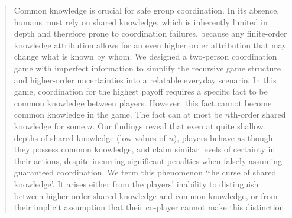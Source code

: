 \begin{abstract}
Common knowledge is crucial for safe group coordination. In its absence, %
humans must %
rely on shared knowledge, %
which is inherently limited in depth and therefore prone to coordination failures,
because any finite-order knowledge attribution allows for an even higher order attribution that may change what is known by whom. 
 We %
designed a two-person coordination game with imperfect information to simplify the %
recursive game structure  and higher-order uncertainties into a relatable everyday scenario. 
In this game, coordination %
for the highest payoff requires a specific fact to be common knowledge between players. 
However, this fact cannot become common knowledge %
in the game. The fact can at most be $n$th-order shared knowledge for some $n$.
Our findings reveal that even at quite shallow depths of shared knowledge (low values of $n$), players behave as though they possess common knowledge, and %
claim similar levels of certainty in their actions, %
despite incurring significant penalties when falsely assuming guaranteed coordination.
We term this phenomenon `the curse of shared knowledge'. It %
arises either from the players' %
inability to distinguish between higher-order shared knowledge and common knowledge, or from their implicit assumption that their co-player cannot make this distinction.
  

\end{abstract}

